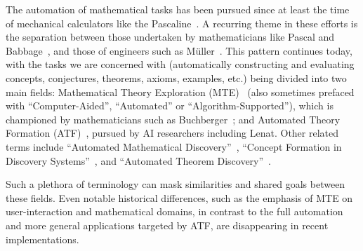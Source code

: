 
The automation of mathematical tasks has been pursued since at least the time of
mechanical calculators like the Pascaline~\cite{d'ocagne}. A recurring theme in
these efforts is the separation between those undertaken by mathematicians like
Pascal and Babbage~\cite{bowden}, and those of engineers such as
M\"uller~\cite[p. 65]{lindgren}. This pattern continues today, with the tasks we
are concerned with (automatically constructing and evaluating concepts,
conjectures, theorems, axioms, examples, etc.) being divided into two main
fields: Mathematical Theory Exploration (MTE)~\cite{buchberger:06} (also
sometimes prefaced with ``Computer-Aided'', ``Automated'' or
``Algorithm-Supported''), which is championed by mathematicians such as
Buchberger~\cite{buchberger}; and Automated Theory Formation
(ATF)~\cite{lenat:77,colton:book}, pursued by AI researchers including Lenat.
Other related terms include ``Automated Mathematical
Discovery''~\cite{epstein:91,colton2000notion,esarm2008},
``Concept Formation in Discovery Systems''~\cite{haase}, and
``Automated Theorem Discovery''~\cite{roy}.

Such a plethora of terminology can mask similarities and shared goals between
these fields. Even notable historical differences, such as the emphasis of MTE
on user-interaction and mathematical domains, in contrast to the full automation
and more general applications targeted by ATF, are disappearing in recent
implementations.
